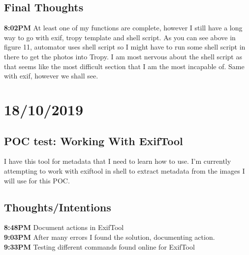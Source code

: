 \documentclass{article}
\begin{document}
\subsection{Final Thoughts}
\textbf{8:02PM} At least one of my functions are complete, however I still have a long way to go with exif, tropy template and shell script. As you can see above in figure 11, automator uses shell script so I might have to run some shell script in there to get the photos into Tropy. I am most nervous about the shell script as that seems like the most difficult section that I am the most incapable of. Same with exif, however we shall see.

\section{18/10/2019}
\subsection{POC test: Working With ExifTool}
I have this tool for metadata that I need to learn how to use. I'm currently attempting to work with exiftool in shell to extract metadata from the images I will use for this POC.

\subsection{Thoughts/Intentions}
\textbf{8:48PM} Document actions in ExifTool \\
\textbf{9:03PM} After many errors I found the solution, documenting action. \\
\textbf{9:33PM} Testing different commands found online for ExifTool
\end{document}
